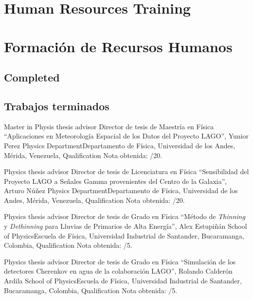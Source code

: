 \ifeng
\section*{Human Resources Training}
\else
\section*{Formación de Recursos Humanos}
\fi


\ifeng
\subsection*{Completed}
\else
\subsection*{Trabajos terminados}
\fi

\ifeng
Master in Physis thesis advisor
 \else
Director de tesis de Maestría en Física
 \fi
 ``Aplicaciones en Meteorología Espacial de los Datos del Proyecto LAGO'', Yunior Perez \at \ifeng Physics Department\else Departamento de Física\fi, Universidad de los Andes, Mérida, Venezuela, \ifeng Qualification \else Nota obtenida: /20.

\ifeng
Physics thesis advisor
 \else
Director de tesis de Licenciatura en Física
 \fi
``Sensibilidad del Proyecto LAGO a Señales Gamma provenientes del Centro de la Galaxia'', Arturo Núñez \at \ifeng Physics Department\else Departamento de Física\fi, Universidad de los Andes, Mérida, Venezuela, \ifeng Qualification \else Nota obtenida: /20.

\ifeng
Physics thesis advisor
 \else
Director de tesis de Grado en Física
 \fi
``Método de {\textit{Thinning}} y {\textit{Dethinning}} para Lluvias de Primarios de Alta Energía'', Alex Estupiñán \at \ifeng School of Physics\else Escuela de Física\fi, Universidad Industrial de Santander, Bucaramanga, Colombia, \ifeng Qualification \else Nota obtenida: /5.

\ifeng
Physics thesis advisor
 \else
Director de tesis de Grado en Física
 \fi
``Simulación de los detectores Cherenkov en agua de la colaboración LAGO'', Rolando Calderón Ardila \at \ifeng School of Physics\else Escuela de Física\fi, Universidad Industrial de Santander, Bucaramanga, Colombia, \ifeng Qualification \else Nota obtenida: /5. 

